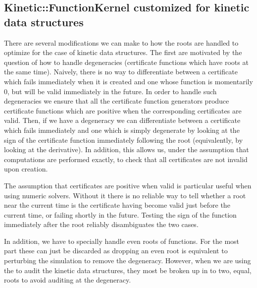\subsection{Kinetic::FunctionKernel customized for kinetic data structures}

There are several modifications we can make to how the roots are
handled to optimize for the case of kinetic data structures.  The
first are motivated by the question of how to handle degeneracies
(certificate functions which have roots at the same time).  Naively,
there is no way to differentiate between a certificate which fails
immediately when it is created and one whose function is momentarily
0, but will be valid immediately in the future. In order to handle
such degeneracies we ensure that all the certificate function
generators produce certificate functions which are positive when the
corresponding certificates are valid.  Then, if we have a degeneracy
we can differentiate between a certificate which fails immediately and
one which is simply degenerate by looking at the sign of the
certificate function immediately following the root (equivalently, by
looking at the derivative). In addition, this allows us, under the
assumption that computations are performed exactly, to check that all
certificates are not invalid upon creation.

The assumption that certificates are positive when valid is particular
useful when using numeric solvers.  Without it there is no reliable
way to tell whether a root near the current time is the certificate
having become valid just before the current time, or failing shortly
in the future. Testing the sign of the function immediately after the
root reliably disambiguates the two cases.

In addition, we have to specially handle even roots of functions. For
the most part these can just be discarded as dropping an even root is
equivalent to perturbing the simulation to remove the degeneracy.
However, when we are using the  to audit the
kinetic data structures, they most be broken up in to two, equal,
roots to avoid auditing at the degeneracy.
